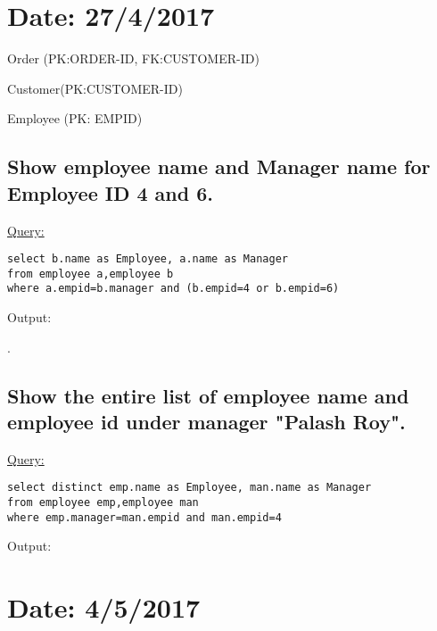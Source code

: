 \documentclass[a4paper,11pt]{article}
\begin{document}
\bigskip
\bigskip

\section{Date: 27/4/2017}
\bigskip

\LARGE{Order (PK:ORDER-ID, FK:CUSTOMER-ID)}

\bigskip

\large{}
\bigskip

\LARGE{Customer(PK:CUSTOMER-ID)}

\bigskip
\bigskip

\large{}
\LARGE{Employee (PK: EMPID)}

\subsection{Show employee name and Manager name for Employee ID 4 and 6.}
\underline{Query:}
\begin{lstlisting}[showstringspaces=false]
select b.name as Employee, a.name as Manager 
from employee a,employee b
where a.empid=b.manager and (b.empid=4 or b.empid=6)
\end{lstlisting}
Output:
\begin{figure}[H]
\centering
{}
\end{figure}
.

\subsection{Show the entire list of employee name and employee id under manager "Palash Roy".}
\underline{Query:}
\begin{lstlisting}[showstringspaces=false]
select distinct emp.name as Employee, man.name as Manager 
from employee emp,employee man
where emp.manager=man.empid and man.empid=4
\end{lstlisting}
Output:
\begin{figure}[H]
\centering
{}
\end{figure}

\bigskip
\bigskip
\section{Date: 4/5/2017}
\large{}
\bigskip
\end{document}
